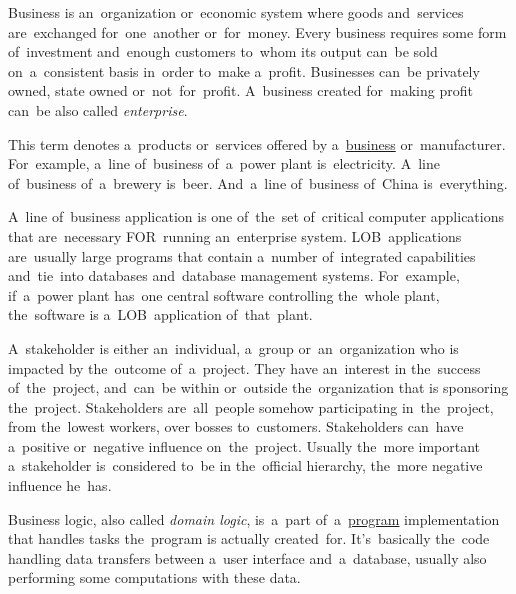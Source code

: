 \label{business}
Business is an~organization or~economic system where goods and~services are~exchanged for~one~another or~for~money. Every business requires some form of~investment and~enough customers to~whom its output can~be sold on~a~consistent basis in~order to~make a~profit. Businesses can~be privately owned, state owned or~not~for~profit. A~business created for~making profit can~be also called \textit{enterprise}.

This term denotes a~products or~services offered by a~\hyperref[business]{business} or~manufacturer. For~example, a~line of~business of~a~power plant is~electricity. A~line of~business of~a~brewery is~beer. And~a~line of~business of~China is~everything.

A~line of~business application is one of~the~set of~critical computer applications that are~necessary FOR~running an~enterprise system. LOB~applications are~usually large programs that contain a~number of~integrated capabilities and~tie~into databases and~database management systems. For~example, if~a~power plant has~one central software controlling the~whole plant, the~software is a~LOB~application of~that~plant.

A~stakeholder is either an~individual, a~group or~an~organization who is impacted by the~outcome of~a~project. They have an~interest in the~success of~the~project, and~can~be within or~outside the~organization that is sponsoring the~project. Stakeholders are~all~people somehow participating in~the~project, from the~lowest workers, over bosses to~customers. Stakeholders can~have a~positive or~negative influence on~the~project. Usually the~more important a~stakeholder is~considered to~be in the~official hierarchy, the~more negative influence he~has.
\newpage

\label{businesslogic}
Business logic, also called \textit{domain logic}, is~a~part of~a~\hyperref[applicationprocessprogramservicethread]{program} implementation that handles tasks the~program is actually created~for. It's~basically the~code handling data transfers between a~user interface and~a~database, usually also performing some computations with these data.

